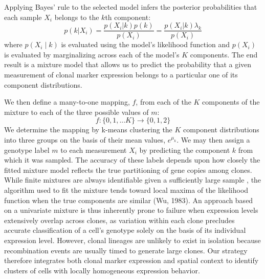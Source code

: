 Applying Bayes' rule to the selected model infers the posterior probabilities that each sample $X_i$ belongs to the $k$th component:
\begin{equation}
p(k|X_i) = \frac{p(X_i | k) p(k)}{p(X_i)} = \frac{p(X_i | k) \lambda_k}{p(X_i)}
\end{equation}
where $p(X_i \mid k)$ is evaluated using the model's likelihood function and $p(X_i)$ is evaluated by marginalizing across each of the model's $K$ components. The end result is a mixture model that allows us to predict the probability that a given measurement of clonal marker expression belongs to a particular one of its component distributions.

We then define a many-to-one mapping, $f$, from each of the $K$ components of the mixture to each of the three possible values of $m$:
\begin{equation}
f: \{0,1,...K\} \to \{0,1,2\}
\end{equation}
We determine the mapping by k-means clustering the $K$ component distributions into three groups on the basis of their mean values, $e^{\mu_k}$. We may then assign a genotype label $m$ to each measurement $X_i$ by predicting the component $k$ from which it was sampled. The accuracy of these labels depends upon how closely the fitted mixture model reflects the true partitioning of gene copies among clones. While finite mixtures are always identifiable given a sufficiently large sample \cite{Teicher1963}, the algorithm used to fit the mixture tends toward local maxima of the likelihood function when the true components are similar (Wu, 1983). An approach based on a univariate mixture is thus inherently prone to failure when expression levels extensively overlap across clones, as variation within each clone precludes accurate classification of a cell's genotype solely on the basis of its individual expression level. However, clonal lineages are unlikely to exist in isolation because recombination events are usually timed to generate large clones. Our strategy therefore integrates both clonal marker expression and spatial context to identify clusters of cells with locally homogeneous expression behavior.

